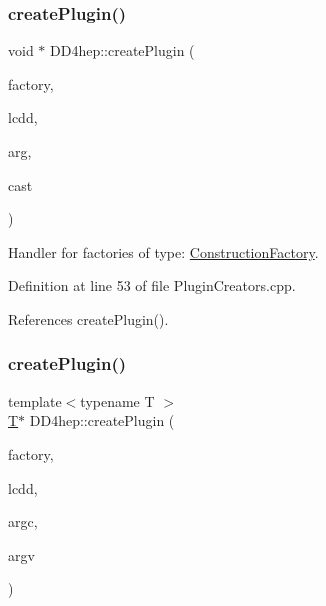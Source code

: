 \subsubsection{\texorpdfstring{create\+Plugin()}{createPlugin()}\hspace{0.1cm}{\footnotesize\ttfamily [5/6]}}
{\footnotesize\ttfamily void $\ast$ D\+D4hep\+::create\+Plugin (\begin{DoxyParamCaption}\item[{const std\+::string \&}]{factory,  }\item[{\hyperlink{class_d_d4hep_1_1_geometry_1_1_l_c_d_d}{Geometry\+::\+L\+C\+DD} \&}]{lcdd,  }\item[{const std\+::string \&}]{arg,  }\item[{void $\ast$($\ast$)(void $\ast$)}]{cast }\end{DoxyParamCaption})}



Handler for factories of type\+: \hyperlink{class_d_d4hep_1_1_construction_factory}{Construction\+Factory}. 



Definition at line 53 of file Plugin\+Creators.\+cpp.



References create\+Plugin().

\hypertarget{namespace_d_d4hep_a24e0c03535a83f151800c5b43f3eae25}{}\label{namespace_d_d4hep_a24e0c03535a83f151800c5b43f3eae25} 
\subsubsection{\texorpdfstring{create\+Plugin()}{createPlugin()}\hspace{0.1cm}{\footnotesize\ttfamily [6/6]}}
{\footnotesize\ttfamily template$<$typename T $>$ \\
\hyperlink{class_t}{T}$\ast$ D\+D4hep\+::create\+Plugin (\begin{DoxyParamCaption}\item[{const std\+::string \&}]{factory,  }\item[{\hyperlink{class_d_d4hep_1_1_geometry_1_1_l_c_d_d}{Geometry\+::\+L\+C\+DD} \&}]{lcdd,  }\item[{int}]{argc,  }\item[{const void $\ast$$\ast$}]{argv }\end{DoxyParamCaption})}



